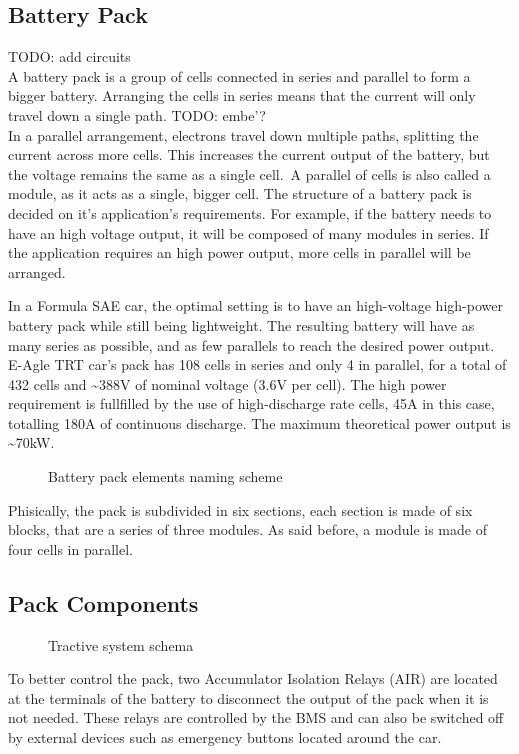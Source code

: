 \subsection{Battery Pack}
TODO: add circuits\\
A battery pack is a group of cells connected in series and parallel to form a bigger battery. Arranging the cells in series means that the current will only travel down a single path. TODO: embe'?\\
In a parallel arrangement, electrons travel down multiple paths, splitting the current across more cells. This increases the current output of the battery, but the voltage remains the same as a single cell.\ A parallel of cells is also called a module, as it acts as a single, bigger cell.
The structure of a battery pack is decided on it's application's requirements. For example, if the battery needs to have an high voltage output, it will be composed of many modules in series. If the application requires an high power output, more cells in parallel will be arranged.

In a Formula SAE car, the optimal setting is to have an high-voltage high-power battery pack while still being lightweight. The resulting battery will have as many series as possible, and as few parallels to reach the desired power output. E-Agle TRT car's pack has 108 cells in series and only 4 in parallel, for a total of 432 cells and \~{}388V of nominal voltage (3.6V per cell). The high power requirement is fullfilled by the use of high-discharge rate cells, 45A in this case, totalling 180A of continuous discharge. The maximum theoretical power output is \~{}70kW.

\begin{figure}[h]
    \centering
    
    \caption{Battery pack elements naming scheme}
    \label{fig:naming}
\end{figure}
Phisically, the pack is subdivided in six sections, each section is made of six blocks, that are a series of three modules. As said before, a module is made of four cells in parallel.

\subsection{Pack Components}
\begin{figure}[h]
    \centering
    
    \caption{Tractive system schema}
    \label{fig:tractive_system_detail}
\end{figure}
To better control the pack, two Accumulator Isolation Relays (AIR) are located at the terminals of the battery to disconnect the output of the pack when it is not needed. These relays are controlled by the BMS and can also be switched off by external devices such as emergency buttons located around the car.

